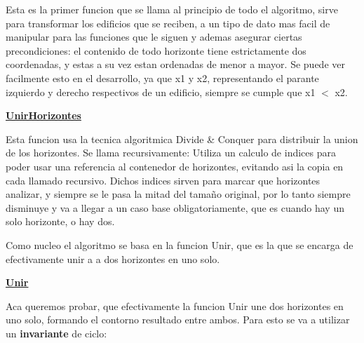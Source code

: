 \documentclass[10pt,a4paper]{article}
\begin{document}
Esta es la primer funcion que se llama al principio de todo el algoritmo, sirve para transformar los edificios que se reciben, a un tipo de dato mas facil de manipular para las funciones que le siguen y ademas asegurar ciertas precondiciones: el contenido de todo horizonte tiene estrictamente dos coordenadas, y estas a su vez estan ordenadas de menor a mayor. Se puede ver facilmente esto en el desarrollo, ya que x1 y x2, representando el parante izquierdo y derecho respectivos de un edificio, siempre se cumple que x1 $<$ x2.

\noindent \underline{\textbf{UnirHorizontes}}

Esta funcion usa la tecnica algoritmica Divide \& Conquer para distribuir la union de los horizontes. Se llama recursivamente: Utiliza un calculo de indices para poder usar una referencia al contenedor de horizontes, evitando asi la copia en cada llamado recursivo. Dichos indices sirven para marcar que horizontes analizar, y siempre se le pasa la mitad del tamaño original, por lo tanto siempre disminuye y va a llegar a un caso base obligatoriamente, que es cuando hay un solo horizonte, o hay dos.

Como nucleo el algoritmo se basa en la funcion Unir, que es la que se encarga de efectivamente unir a a dos horizontes en uno solo.

\noindent \underline{\textbf{Unir}}

Aca queremos probar, que efectivamente la funcion Unir une dos horizontes en uno solo, formando el contorno resultado entre ambos. Para esto se va a utilizar un \textbf{invariante} de ciclo: 
\end{document}

